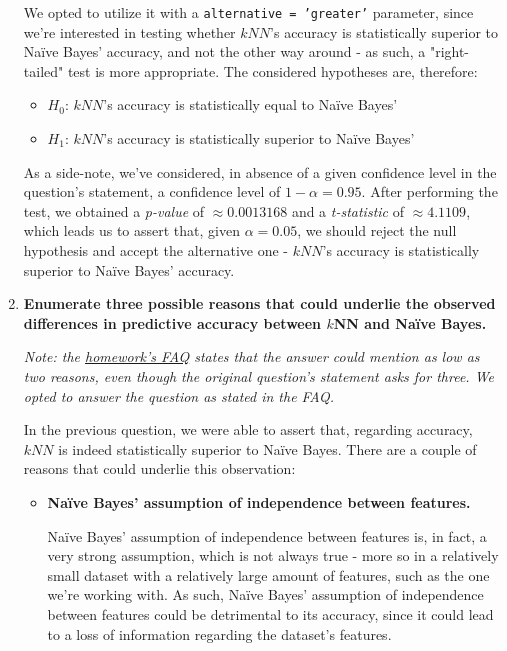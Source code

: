 \documentclass[12pt]{article}
\begin{document}
\begin{enumerate}[leftmargin=\labelsep,resume]
  We opted to utilize it with a \texttt{alternative = 'greater'} parameter, since
  we're interested in testing whether $kNN$'s accuracy is statistically superior
  to Naïve Bayes' accuracy, and not the other way around - as such, a "right-tailed"
  test is more appropriate.
  The considered hypotheses are, therefore:

  \begin{itemize}
    \item $H_0$: $kNN$'s accuracy is statistically equal to Naïve Bayes'
    \item $H_1$: $kNN$'s accuracy is statistically superior to Naïve Bayes'
  \end{itemize}

  As a side-note, we've considered, in absence of a given confidence level in the
  question's statement, a confidence level of $1 - \alpha = 0.95$.
  After performing the test, we obtained a \textit{p-value} of $\approx 0.0013168$ and
  a \textit{t-statistic} of $\approx 4.1109$, which leads us to assert that, given
  $\alpha = 0.05$, we should reject the null hypothesis and accept the alternative
  one - $kNN$'s accuracy is statistically superior to Naïve Bayes' accuracy.

  \pagebreak
   
  \item \textbf{Enumerate three possible reasons that could underlie the observed differences in predictive
  accuracy between $k$NN and Naïve Bayes.}

  \textit{Note: the \href{https://fenix.tecnico.ulisboa.pt/disciplinas/Apre2/2022-2023/1-semestre/homeworks}{homework's FAQ}
  states that the answer could mention as low as two reasons, even though the original
  question's statement asks for three. We opted to answer the question as stated in
  the FAQ.}

  \vspace*{0.5cm}

  In the previous question, we were able to assert that, regarding accuracy, $kNN$ is
  indeed statistically superior to Naïve Bayes. There are a couple of reasons
  that could underlie this observation:

  \begin{itemize}
    \item \textbf{Naïve Bayes' assumption of independence between features.}
    
    Naïve Bayes' assumption of independence between features is, in fact, a very
    strong assumption, which is not always true - more so in a relatively small dataset
    with a relatively large amount of features, such as the one we're working with.
    As such, Naïve Bayes' assumption of independence between features could be
    detrimental to its accuracy, since it could lead to a loss of information
    regarding the dataset's features.


\end{itemize}
\end{enumerate}
\end{document}
